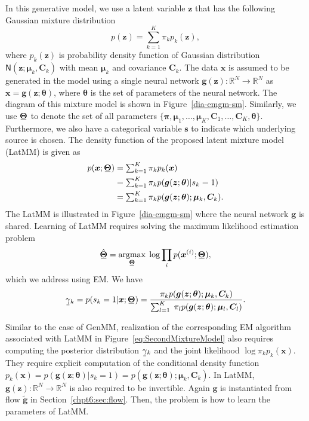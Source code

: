 In this generative model, we use a latent variable $\bm{z}$ that has the following Gaussian mixture distribution
\begin{equation}
  p(\bm{z}) = \sum_{k=1}^K \pi_k p_k(\bm{z}), %
\end{equation}
where $p_k(\bm{z})$ is probability density function of Gaussian distribution $\mathsf{N}(\bm{z};\bm{\mu}_k,\bm{C}_k)$ with mean $\bm{\mu}_k$ and covariance $\bm{C}_k$.
The data $\bm{x}$ is
assumed to be generated in the model using a single neural network
$\bm{g}(\bm{z}): \mathbb{R}^N \rightarrow \mathbb{R}^N$ as
$\bm{x}=\bm{g}(\bm{z};\bm{\theta})$, where $\bm{\theta}$
is the set of parameters of the neural network. The diagram of this mixture model
is shown in Figure~\ref{dia-emgm-sm}. Similarly, we use $\ubar{\bm{\Theta}}$ to denote the set of all parameters $\{ \bm{\pi},
\bm{\mu}_1,\hdots, \bm{\mu}_K, \bm{C}_1,\hdots,
\bm{C}_K, \bm{\theta} \}$. Furthermore, we also have a categorical variable $\bm{s}$ to indicate which underlying source is chosen. The density function of the proposed latent mixture model (LatMM) is given as
\begin{align}\label{eq:SecondMixtureModel}
  p(\bm{x};\ubar{\bm{\Theta}}) & = \textstyle\sum_{k=1}^K \pi_k p_k(\bm{x}) \nonumber\\
                               &= \textstyle\sum_{k=1}^K \pi_k  p(\bm{g}(\bm{z}; \bm{\theta})| s_k=1) \nonumber \\
                               & = \textstyle\sum_{k=1}^K \pi_k  p(\bm{g}(\bm{z};\bm{\theta}); \bm{\mu}_k, \bm{C}_k).
\end{align}
The LatMM is illustrated in Figure~\ref{dia-emgm-sm} where the neural network $\bm{g}$ is shared. Learning of LatMM requires solving the maximum likelihood estimation problem
\begin{equation}
  \ubar{\hat{\bm{\Theta}}} =    \uargmax{\ubar{\bm{\Theta}}}{} \log \prod_{i} p(\bm{x}^{(i)};\ubar{\bm{\Theta}}),
\end{equation}
which we address using EM.
We have
\begin{align}\label{eq-latMM-gamma}
  \ubar{\gamma}_k = p(s_k =1|\bm{x};\ubar{\bm{\Theta}})  
  = \frac{\pi_k p(\bm{g}(\bm{z};\bm{\theta});\bm{\mu}_k, \bm{C}_k)}{\sum_{l=1}^K\; \pi_l p(\bm{g}(\bm{z};\bm{\theta});\bm{\mu}_l, \bm{C}_l)}.
\end{align}

Similar to the case of GenMM, realization of the corresponding EM
algorithm associated with LatMM in Figure~\ref{eq:SecondMixtureModel}
also requires computing the posterior distribution $\ubar{\gamma}_k$ and the joint likelihood $\log{\pi_k p_k(\bm{x})}$. They require explicit computation of the conditional density function $p_k(\bm{x}) = p(\bm{g}(\bm{z};\bm{\theta})| s_k=1) = p(\bm{g}(\bm{z};\bm{\theta});\bm{\mu}_k, \bm{C}_k) $. In LatMM, $\bm{g}(\bm{z}): \mathbb{R}^N \rightarrow \mathbb{R}^N$ is also required to be invertible. Again $\bm{g}$ is instantiated from flow $\tilde{\bm{g}}$ in Section~\ref{chpt6:sec:flow}. Then, the problem is how to learn the parameters of LatMM.


